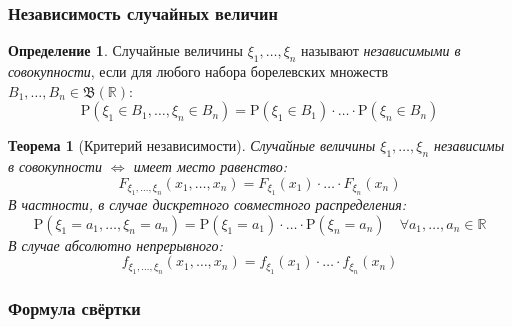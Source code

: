 \documentclass[oneside,final,14pt]{extreport}
\newtheorem{thm}{Теорема}[section]
\theoremstyle{definition}
\newtheorem{defn}{Определение}[section]
\begin{document}
\subsubsection{Независимость случайных величин}
\begin{defn}
    Случайные величины $\xi_1, \ldots, \xi_n$ называют {\it независимыми в совокупности}, если для любого набора борелевских множеств $B_{1}, \ldots, B_{n} \in \mathfrak{B}(\mathbb{R})$:
    \begin{equation*}
        \mathrm{P}\left(\xi_{1} \in B_{1}, \ldots, \xi_{n} \in B_{n}\right)=\mathrm{P}\left(\xi_{1} \in B_{1}\right) \cdot \ldots \cdot \mathrm{P}\left(\xi_{n} \in B_{n}\right)
    \end{equation*}
\end{defn}
\begin{thm}[Критерий независимости]
    Случайные величины $\xi_1, \ldots, \xi_n$ независимы в совокупности $\Leftrightarrow$ имеет место равенство:
    \begin{equation*}
        F_{\xi_{1}, \ldots, \xi_{n}}\left(x_{1}, \ldots, x_{n}\right)=F_{\xi_{1}}\left(x_{1}\right) \cdot \ldots \cdot F_{\xi_{n}}\left(x_{n}\right)
    \end{equation*}
    В частности, в случае дискретного совместного распределения:
    \begin{equation*}
        \mathrm{P}\left(\xi_{1}=a_{1}, \ldots, \xi_{n}=a_{n}\right)=\mathrm{P}\left(\xi_{1}=a_{1}\right) \cdot \ldots \cdot \mathrm{P}\left(\xi_{n}=a_{n}\right) \quad \forall a_1, \ldots, a_n \in \mathbb{R}
    \end{equation*}
    В случае абсолютно непрерывного:
    \begin{equation*}
        f_{\xi_{1}, \ldots, \xi_{n}}\left(x_{1}, \ldots, x_{n}\right)=f_{\xi_{1}}\left(x_{1}\right) \cdot \ldots \cdot f_{\xi_{n}}\left(x_{n}\right)
    \end{equation*}
\end{thm}

\subsubsection{Формула свёртки}
\end{document}

